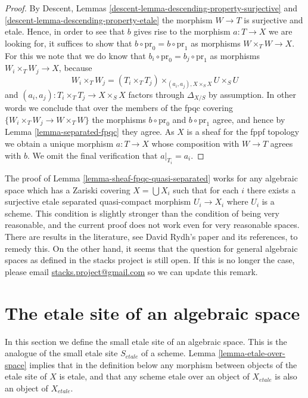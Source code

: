 \begin{proof}
\medskip\noindent
By
Descent, Lemmas \ref{descent-lemma-descending-property-surjective}
and \ref{descent-lemma-descending-property-etale}
the morphism $W \to T$ is surjective and etale. Hence, in order to see
that $b$ gives rise to the morphism $a : T \to X$ we are looking for,
it suffices to show that $b \circ \text{pr}_0 = b \circ \text{pr}_1$
as morphisms $W \times_T W \to X$. For this we note that we do know
that $b_i \circ \text{pr}_0 = b_j \circ \text{pr}_1$ as morphisms
$W_i \times_T W_j \to X$, because
$$
W_i \times_T W_j = (T_i \times_T T_j)
\times_{(a_i, a_j), X \times_S X} U \times_S U
$$
and $(a_i, a_j) : T_i \times_T T_j \to X \times_S X$ factors
through $\Delta_{X/S}$ by assumption. In other words we conclude that
over the members of the fpqc covering $\{W_i \times_T W_j \to W \times_T W\}$
the morphisms $b \circ \text{pr}_0$ and $b \circ \text{pr}_1$ agree,
and hence by
Lemma \ref{lemma-separated-fpqc}
they agree. As $X$ is a sheaf for the fppf topology we obtain a unique
morphism $a : T \to X$ whose composition with $W \to T$ agrees with $b$.
We omit the final verification that $a|_{T_i} = a_i$.
\end{proof}

\begin{remark}
\label{remark-proof-works-when}
The proof of
Lemma \ref{lemma-sheaf-fpqc-quasi-separated}
works for any algebraic space which has a
Zariski covering $X = \bigcup X_i$ such that for each $i$ there exists
a surjective etale separated quasi-compact morphism $U_i \to X_i$
where $U_i$ is a scheme. This condition is slightly stronger than the
condition of being very reasonable, and the current proof does not work
even for very reasonable spaces. There are results in the literature, see
David Rydh's paper \cite{rydh_descent} and its references, to remedy this.
On the other hand, it seems that the question for general algebraic spaces
as defined in the stacks project is still open. If this is no longer the
case, please email
\href{mailto:stacks.project@gmail.com}{stacks.project@gmail.com}
so we can update this remark.
\end{remark}








\section{The etale site of an algebraic space}
\label{section-etale-site}

\noindent
In this section we define the small etale site of an algebraic space.
This is the analogue of the small etale site $S_{etale}$ of a scheme.
Lemma \ref{lemma-etale-over-space} implies that in the definition below
any morphism between objects of the etale site of $X$ is etale, and that
any scheme etale over an object of $X_{etale}$ is also an object of
$X_{etale}$.

